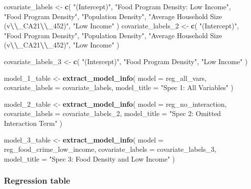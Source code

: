 \documentclass[
]{article}
\newenvironment{Shaded}{\begin{snugshade}}{\end{snugshade}}
\newcommand{\AttributeTok}[1]{\textcolor[rgb]{0.13,0.29,0.53}{#1}}
\newcommand{\FunctionTok}[1]{\textcolor[rgb]{0.13,0.29,0.53}{\textbf{#1}}}
\newcommand{\NormalTok}[1]{#1}
\newcommand{\OtherTok}[1]{\textcolor[rgb]{0.56,0.35,0.01}{#1}}
\newcommand{\SpecialCharTok}[1]{\textcolor[rgb]{0.81,0.36,0.00}{\textbf{#1}}}
\newcommand{\StringTok}[1]{\textcolor[rgb]{0.31,0.60,0.02}{#1}}
\begin{document}
\begin{Shaded}
\begin{Highlighting}[]
\NormalTok{covariate\_labels }\OtherTok{\textless{}{-}} \FunctionTok{c}\NormalTok{(}
  \StringTok{"(Intercept)"}\NormalTok{, }
  \StringTok{"Food Program Density: Low Income"}\NormalTok{,}
  \StringTok{"Food Program Density"}\NormalTok{,}
  \StringTok{"Population Density"}\NormalTok{, }
  \StringTok{"Average Household Size (v}\SpecialCharTok{\textbackslash{}\textbackslash{}}\StringTok{\_CA21}\SpecialCharTok{\textbackslash{}\textbackslash{}}\StringTok{\_452)"}\NormalTok{,}
  \StringTok{"Low Income"}
\NormalTok{)}
\NormalTok{covariate\_labels\_2 }\OtherTok{\textless{}{-}} \FunctionTok{c}\NormalTok{(}
  \StringTok{"(Intercept)"}\NormalTok{,}
  \StringTok{"Food Program Density"}\NormalTok{,}
  \StringTok{"Population Density"}\NormalTok{, }
  \StringTok{"Average Household Size (v}\SpecialCharTok{\textbackslash{}\textbackslash{}}\StringTok{\_CA21}\SpecialCharTok{\textbackslash{}\textbackslash{}}\StringTok{\_452)"}\NormalTok{,}
  \StringTok{"Low Income"}
\NormalTok{)}

\NormalTok{covariate\_labels\_3 }\OtherTok{\textless{}{-}} \FunctionTok{c}\NormalTok{(}
  \StringTok{"(Intercept)"}\NormalTok{,}
  \StringTok{"Food Program Density"}\NormalTok{,}
  \StringTok{"Low Income"}
\NormalTok{)}

\NormalTok{model\_1\_table }\OtherTok{\textless{}{-}} \FunctionTok{extract\_model\_info}\NormalTok{(}
  \AttributeTok{model =}\NormalTok{ reg\_all\_vars,}
  \AttributeTok{covariate\_labels =}\NormalTok{ covariate\_labels,}
  \AttributeTok{model\_title =} \StringTok{"Spec 1: All Variables"}
\NormalTok{)}

\NormalTok{model\_2\_table }\OtherTok{\textless{}{-}} \FunctionTok{extract\_model\_info}\NormalTok{(}
  \AttributeTok{model =}\NormalTok{ reg\_no\_interaction,}
  \AttributeTok{covariate\_labels =}\NormalTok{ covariate\_labels\_2,}
  \AttributeTok{model\_title =} \StringTok{"Spec 2: Omitted Interaction Term"}
\NormalTok{)}

\NormalTok{model\_3\_table }\OtherTok{\textless{}{-}} \FunctionTok{extract\_model\_info}\NormalTok{(}
  \AttributeTok{model =}\NormalTok{ reg\_food\_crime\_low\_income,}
  \AttributeTok{covariate\_labels =}\NormalTok{ covariate\_labels\_3,}
  \AttributeTok{model\_title =} \StringTok{"Spec 3: Food Density and Low Income"}
\NormalTok{)}
\end{Highlighting}
\end{Shaded}

\subsubsection{Regression table}\label{regression-table}
\end{document}
